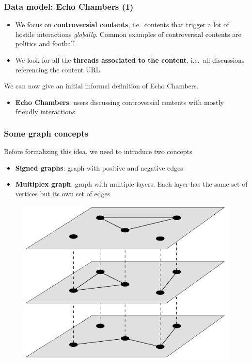 \documentclass[aspectratio=169]{beamer}
\begin{document}
\begin{frame}[c]
	\frametitle{Data model: Echo Chambers (1)}
	\begin{itemize}
		\item We focus on \textbf{controversial contents}, i.e.\ contents that
		      trigger a lot of hostile interactions \emph{globally}. Common
		      examples of controversial contents are politics and football
		      \pause
		\item We look for all the \textbf{threads associated to the content},
		      i.e.\ all discussions referencing the content URL
	\end{itemize}
	\bigskip
	\pause

	We can now give an initial informal definition of Echo Chambers.
	\begin{itemize}
		\item \textbf{Echo Chambers}: users discussing controversial contents
		      with mostly friendly interactions
	\end{itemize}
\end{frame}

\begin{frame}[c]
	\frametitle{Some graph concepts}
	Before formalizing this idea, we need to introduce two concepts

	\begin{itemize}
		\item \textbf{Signed graphs}: graph with positive and negative edges
		      \pause
		\item \textbf{Multiplex graph}: graph with multiple layers. Each layer
		      has the same set of vertices but its own set of edges
	\end{itemize}

	\begin{figure}
		\centering
		\includegraphics[width=0.3\linewidth]{../../tex/img/multiplex-graph.png}
	\end{figure}

\end{frame}
\end{document}
